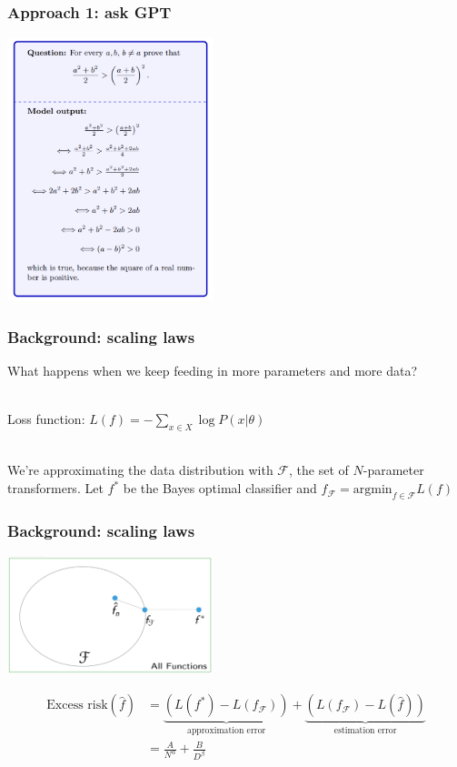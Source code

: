 \documentclass[handout]{beamer}
\begin{document}
\begin{frame}
\frametitle{Approach 1: ask GPT}
\begin{center}
\includegraphics[width=0.45\textwidth]{img/minerva_example.png} 
\end{center}
\end{frame}

\begin{frame}
\frametitle{Background: scaling laws}
What happens when we keep feeding in more parameters and more data?\\~\

Loss function: $L(f) = -\sum_{x\in X}\log P(x | \theta)$\\~\

We're approximating the data distribution with $\mathcal{F}$, the set of $N$-parameter transformers. Let $f^*$ be the Bayes optimal classifier and $f_{\mathcal{F}} = \mathrm{argmin}_{f\in \mathcal{F}} L(f)$
\end{frame}

\begin{frame}
\frametitle{Background: scaling laws}
\begin{center}
\includegraphics[width=0.45\textwidth]{img/excess_risk.png}
\end{center}
\begin{align*}
    \text{Excess risk}(\hat{f}) &= \underbrace{\left(L(f^*) - L(f_{\mathcal{F}})\right)}_{\text{approximation error}} + \underbrace{\left(L(f_{\mathcal{F}}) - L( \hat{f})\right)}_{\text{estimation error}}\\ 
                                &= \frac{A}{N^\alpha} + \frac{B}{D^\beta}
\end{align*}
\end{frame}
\end{document}

